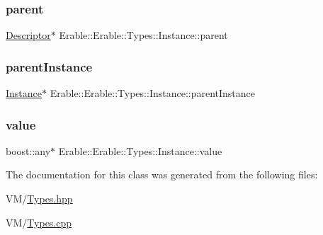 \subsubsection{\texorpdfstring{parent}{parent}}
{\footnotesize\ttfamily \mbox{\hyperlink{class_erable_1_1_descriptor}{Descriptor}}$\ast$ Erable\+::\+Erable\+::\+Types\+::\+Instance\+::parent}

\mbox{\label{class_erable_1_1_erable_1_1_types_1_1_instance_a785d3c2a59f2f4981696d9728130573c}} 
\subsubsection{\texorpdfstring{parentInstance}{parentInstance}}
{\footnotesize\ttfamily \mbox{\hyperlink{class_erable_1_1_erable_1_1_types_1_1_instance}{Instance}}$\ast$ Erable\+::\+Erable\+::\+Types\+::\+Instance\+::parent\+Instance}

\mbox{\label{class_erable_1_1_erable_1_1_types_1_1_instance_a6f7a9514f61ceb2d8c22647fe3833ec3}} 
\subsubsection{\texorpdfstring{value}{value}}
{\footnotesize\ttfamily boost\+::any$\ast$ Erable\+::\+Erable\+::\+Types\+::\+Instance\+::value}



The documentation for this class was generated from the following files\+:\begin{DoxyCompactItemize}
\item 
V\+M/\mbox{\hyperlink{_types_8hpp}{Types.\+hpp}}\item 
V\+M/\mbox{\hyperlink{_types_8cpp}{Types.\+cpp}}\end{DoxyCompactItemize}
